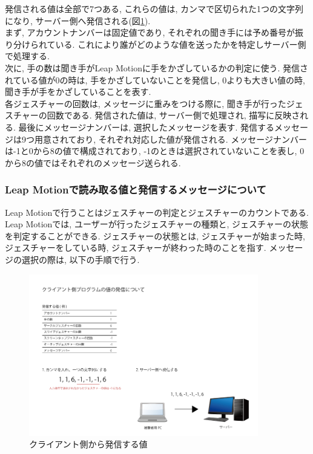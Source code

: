 \documentclass{funthesis}
\begin{document}
発信される値は全部で7つある, これらの値は, カンマで区切られた1つの文字列になり, サーバー側へ発信される(図\ref{send}).\\ 
まず, アカウントナンバーは固定値であり, それぞれの聞き手には予め番号が振り分けられている. これにより誰がどのような値を送ったかを特定しサーバー側で処理する. \\
次に, 手の数は聞き手がLeap Motionに手をかざしているかの判定に使う. 発信されている値が0の時は, 手をかざしていないことを発信し, 0よりも大きい値の時, 聞き手が手をかざしていることを表す. \\
各ジェスチャーの回数は, メッセージに重みをつける際に, 聞き手が行ったジェスチャーの回数である. 発信された値は, サーバー側で処理され, 描写に反映される. 
最後にメッセージナンバーは, 選択したメッセージを表す. 発信するメッセージは9つ用意されており, それぞれ対応した値が発信される. メッセージナンバーは-1と0から8の値で構成されており, -1のときは選択されていないことを表し, 0から8の値ではそれぞれのメッセージ送られる. \\

\subsubsection{Leap Motionで読み取る値と発信するメッセージについて}
Leap Motionで行うことはジェスチャーの判定とジェスチャーのカウントである.  Leap Motionでは, ユーザーが行ったジェスチャーの種類と, ジェスチャーの状態を判定することができる. ジェスチャーの状態とは, ジェスチャーが始まった時, ジェスチャーをしている時, ジェスチャーが終わった時のことを指す. メッセージの選択の際は, 以下の手順で行う. 





\begin{figure}[H]
 \begin{center}
  \includegraphics[width=100mm]{./img/sendCL.png}
 \end{center}
 \caption{クライアント側から発信する値}
 \label{send}
\end{figure}
\end{document}
